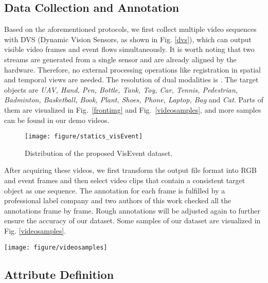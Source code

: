 \documentclass[journal]{IEEEtran}
\begin{document}
\subsection{Data Collection and Annotation} 
Based on the aforementioned protocols, we first collect multiple video sequences with DVS (Dynamic Vision Sensors, as shown in Fig. \ref{dvs}), which can output visible video frames and event flows simultaneously. It is worth noting that two streams are generated from a single sensor and are already aligned by the hardware. Therefore, no external processing operations like registration in spatial and temporal views are needed. The resolution of dual modalities is . The target objects are \emph{UAV, Hand, Pen, Bottle, Tank, Toy, Car, Tennis, Pedestrian, Badminton, Basketball, Book, Plant, Shoes, Phone, Laptop, Bag} and \emph{Cat}. Parts of them are visualized in Fig.~\ref{frontimg} and Fig.~\ref{videosamples}, and more samples can be found in our demo videos.   




\begin{figure}
\center
\texttt{[image: figure/statics\_visEvent]}
\caption{Distribution of the proposed VisEvent dataset.}
\label{staticsvisEvent}
\end{figure} 




After acquiring these videos, we first transform the output file format  into RGB and event frames  and then select video clips that contain a consistent target object as one sequence. The annotation for each frame is fulfilled by a professional label company and two authors of this work checked all the annotations frame by frame. Rough annotations will be adjusted again to further ensure the accuracy of our dataset. Some samples of our dataset are visualized in Fig. \ref{videosamples}.  


\begin{figure*}[!htb]
\center
\texttt{[image: figure/videosamples]}
\caption{Representative samples of our newly proposed VisEvent tracking dataset.} 
\label{videosamples}
\end{figure*} 	





\subsection{Attribute Definition} 
\end{document}
